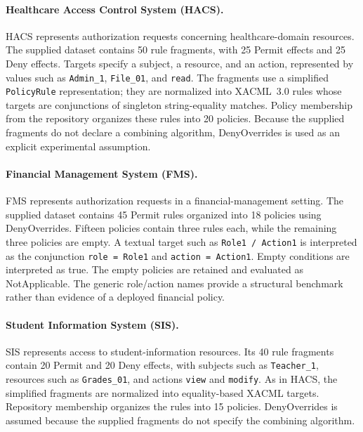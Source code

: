 \paragraph{Healthcare Access Control System (HACS).}
HACS represents authorization requests concerning healthcare-domain
resources. The supplied dataset contains 50 rule fragments, with 25
Permit effects and 25 Deny effects. Targets specify a subject, a
resource, and an action, represented by values such as
\texttt{Admin\_1}, \texttt{File\_01}, and \texttt{read}.
The fragments use a simplified \texttt{PolicyRule} representation;
they are normalized into XACML~3.0 rules whose targets are conjunctions
of singleton string-equality matches. Policy membership from the
repository organizes these rules into 20 policies. Because the supplied
fragments do not declare a combining algorithm, DenyOverrides is used
as an explicit experimental assumption.

\paragraph{Financial Management System (FMS).}
FMS represents authorization requests in a financial-management
setting. The supplied dataset contains 45 Permit rules organized into
18 policies using DenyOverrides. Fifteen policies contain three rules
each, while the remaining three policies are empty. A textual target
such as \texttt{Role1 / Action1} is interpreted as the conjunction
\texttt{role = Role1} and \texttt{action = Action1}. Empty conditions
are interpreted as true. The empty policies are retained and evaluated
as NotApplicable. The generic role/action names provide a structural
benchmark rather than evidence of a deployed financial policy.

\paragraph{Student Information System (SIS).}
SIS represents access to student-information resources. Its 40 rule
fragments contain 20 Permit and 20 Deny effects, with subjects such as
\texttt{Teacher\_1}, resources such as \texttt{Grades\_01}, and actions
\texttt{view} and \texttt{modify}. As in HACS, the simplified fragments
are normalized into equality-based XACML targets. Repository membership
organizes the rules into 15 policies. DenyOverrides is assumed because
the supplied fragments do not specify the combining algorithm.

